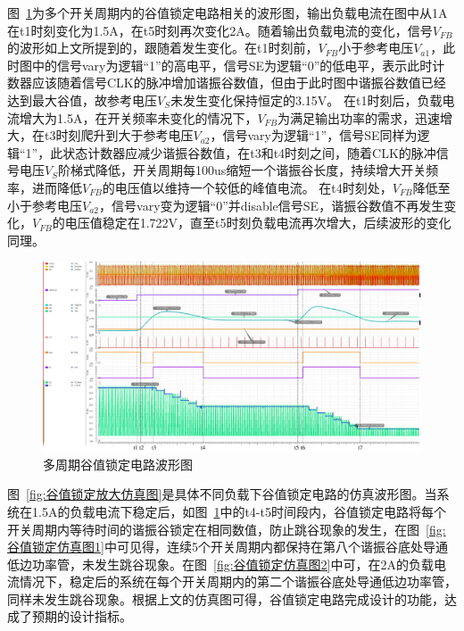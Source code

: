 图~\ref{fig:多周期谷值锁定电路波形图}为多个开关周期内的谷值锁定电路相关的波形图，输出负载电流在图中从1A在t1时刻变化为1.5A，在t5时刻再次变化2A。随着输出负载电流的变化，信号$V_{FB}$的波形如上文所提到的，跟随着发生变化。在t1时刻前，$V_{FB}$小于参考电压$V_{a1}$，此时图中的信号vary为逻辑“1”的高电平，信号SE为逻辑“0”的低电平，表示此时计数器应该随着信号CLK的脉冲增加谐振谷数值，但由于此时图中谐振谷数值已经达到最大谷值，故参考电压$V_S$未发生变化保持恒定的3.15V。
在t1时刻后，负载电流增大为1.5A，在开关频率未变化的情况下，$V_{FB}$为满足输出功率的需求，迅速增大，在t3时刻爬升到大于参考电压$V_{a2}$，信号vary为逻辑“1”，信号SE同样为逻辑“1”，此状态计数器应减少谐振谷数值，在t3和t4时刻之间，随着CLK的脉冲信号电压$V_S$阶梯式降低，开关周期每100us缩短一个谐振谷长度，持续增大开关频率，进而降低$V_{FB}$的电压值以维持一个较低的峰值电流。
在t4时刻处，$V_{FB}$降低至小于参考电压$V_{a2}$，信号vary变为逻辑“0”并disable信号SE，谐振谷数值不再发生变化，$V_{FB}$的电压值稳定在1.722V，直至t5时刻负载电流再次增大，后续波形的变化同理。

\begin{figure}[htbp] 
    \centering
    \includegraphics[width=0.8\linewidth]{figures/valley_lock1.pdf}
    \caption{多周期谷值锁定电路波形图}
    \label{fig:多周期谷值锁定电路波形图}
\end{figure} 

图~\ref{fig:谷值锁定放大仿真图}是具体不同负载下谷值锁定电路的仿真波形图。当系统在1.5A的负载电流下稳定后，如图~\ref{fig:多周期谷值锁定电路波形图}中的t4-t5时间段内，谷值锁定电路将每个开关周期内等待时间的谐振谷锁定在相同数值，防止跳谷现象的发生，在图~\ref{fig:谷值锁定仿真图1}中可见得，连续5个开关周期内都保持在第八个谐振谷底处导通低边功率管，未发生跳谷现象。在图~\ref{fig:谷值锁定仿真图2}中可，在2A的负载电流情况下，稳定后的系统在每个开关周期内的第二个谐振谷底处导通低边功率管，同样未发生跳谷现象。根据上文的仿真图可得，谷值锁定电路完成设计的功能，达成了预期的设计指标。

